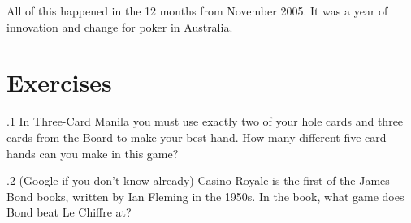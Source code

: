 All of this happened in the 12 months from November 2005. It was a
year of innovation and change for poker in Australia.


\section{Exercises}

.1 In Three-Card Manila you must use exactly two of
your hole cards and three cards from the Board to make your best
hand. How many different five card hands can you make in this game?

.2 (Google if you don't know already) Casino Royale
is the first of the James Bond books, written by Ian Fleming in the
1950s. In the book, what game does Bond beat Le Chiffre at?
